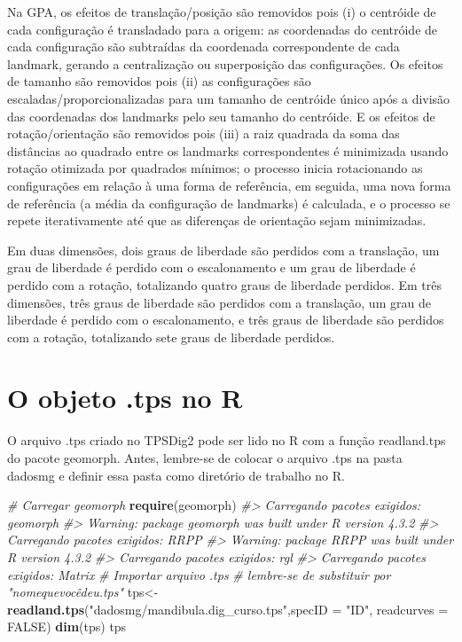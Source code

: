 \documentclass[
]{book}
\newenvironment{Shaded}{\begin{snugshade}}{\end{snugshade}}
\newcommand{\AttributeTok}[1]{\textcolor[rgb]{0.13,0.29,0.53}{#1}}
\newcommand{\CommentTok}[1]{\textcolor[rgb]{0.56,0.35,0.01}{\textit{#1}}}
\newcommand{\ConstantTok}[1]{\textcolor[rgb]{0.56,0.35,0.01}{#1}}
\newcommand{\FunctionTok}[1]{\textcolor[rgb]{0.13,0.29,0.53}{\textbf{#1}}}
\newcommand{\NormalTok}[1]{#1}
\newcommand{\OtherTok}[1]{\textcolor[rgb]{0.56,0.35,0.01}{#1}}
\newcommand{\StringTok}[1]{\textcolor[rgb]{0.31,0.60,0.02}{#1}}
\begin{document}
Na GPA, os efeitos de translação/posição são removidos pois (i) o centróide de cada configuração é transladado para a origem: as coordenadas do centróide de cada configuração são subtraídas da coordenada correspondente de cada landmark, gerando a centralização ou superposição das configurações. Os efeitos de tamanho são removidos pois (ii) as configurações são escaladas/proporcionalizadas para um tamanho de centróide único após a divisão das coordenadas dos landmarks pelo seu tamanho do centróide. E os efeitos de rotação/orientação são removidos pois (iii) a raiz quadrada da soma das distâncias ao quadrado entre os landmarks correspondentes é minimizada usando rotação otimizada por quadrados mínimos; o processo inicia rotacionando as configurações em relação à uma forma de referência, em seguida, uma nova forma de referência (a média da configuração de landmarks) é calculada, e o processo se repete iterativamente até que as diferenças de orientação sejam minimizadas.

Em duas dimensões, dois graus de liberdade são perdidos com a translação, um grau de liberdade é perdido com o escalonamento e um grau de liberdade é perdido com a rotação, totalizando quatro graus de liberdade perdidos. Em três dimensões, três graus de liberdade são perdidos com a translação, um grau de liberdade é perdido com o escalonamento, e três graus de liberdade são perdidos com a rotação, totalizando sete graus de liberdade perdidos.

\section{O objeto .tps no R}\label{o-objeto-.tps-no-r}

O arquivo .tps criado no TPSDig2 pode ser lido no R com a função readland.tps do pacote geomorph. Antes, lembre-se de colocar o arquivo .tps na pasta dadosmg e definir essa pasta como diretório de trabalho no R.

\begin{Shaded}
\begin{Highlighting}[]
\CommentTok{\# Carregar geomorph }
\FunctionTok{require}\NormalTok{(geomorph) }
\CommentTok{\#\textgreater{} Carregando pacotes exigidos: geomorph}
\CommentTok{\#\textgreater{} Warning: package \textquotesingle{}geomorph\textquotesingle{} was built under R version 4.3.2}
\CommentTok{\#\textgreater{} Carregando pacotes exigidos: RRPP}
\CommentTok{\#\textgreater{} Warning: package \textquotesingle{}RRPP\textquotesingle{} was built under R version 4.3.2}
\CommentTok{\#\textgreater{} Carregando pacotes exigidos: rgl}
\CommentTok{\#\textgreater{} Carregando pacotes exigidos: Matrix}
\CommentTok{\# Importar arquivo .tps }
\CommentTok{\# lembre{-}se de substituir por "nomequevocêdeu.tps"}
\NormalTok{tps}\OtherTok{\textless{}{-}}\FunctionTok{readland.tps}\NormalTok{(}\StringTok{"dadosmg/mandibula.dig\_curso.tps"}\NormalTok{,}\AttributeTok{specID =} \StringTok{"ID"}\NormalTok{, }\AttributeTok{readcurves =} \ConstantTok{FALSE}\NormalTok{) }
\FunctionTok{dim}\NormalTok{(tps) }
\NormalTok{tps}
\end{Highlighting}
\end{Shaded}
\end{document}
